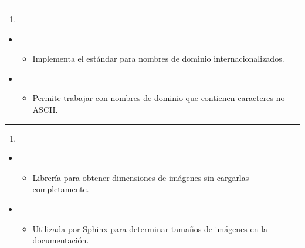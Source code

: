 \documentclass[a4paper,10pt,oneside,spanish,openany]{sphinxmanual}
\begin{document}
\bigskip\hrule\bigskip

\begin{enumerate}
%
\setcounter{enumi}{6}
\item {} 
\sphinxAtStartPar
{}

\end{enumerate}
\begin{itemize}
\item {} 
\sphinxAtStartPar
{}
\begin{itemize}
\item {} 
\sphinxAtStartPar
Implementa el estándar  para nombres de dominio internacionalizados.

\end{itemize}

\item {} 
\sphinxAtStartPar
{}
\begin{itemize}
\item {} 
\sphinxAtStartPar
Permite trabajar con nombres de dominio que contienen caracteres no ASCII.

\end{itemize}

\end{itemize}


\bigskip\hrule\bigskip

\begin{enumerate}
%
\setcounter{enumi}{7}
\item {} 
\sphinxAtStartPar
{}

\end{enumerate}
\begin{itemize}
\item {} 
\sphinxAtStartPar
{}
\begin{itemize}
\item {} 
\sphinxAtStartPar
Librería para obtener dimensiones de imágenes sin cargarlas completamente.

\end{itemize}

\item {} 
\sphinxAtStartPar
{}
\begin{itemize}
\item {} 
\sphinxAtStartPar
Utilizada por Sphinx para determinar tamaños de imágenes en la documentación.

\end{itemize}

\end{itemize}
\end{document}
